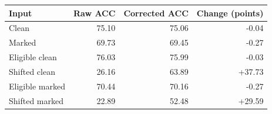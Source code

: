 \begin{tabular}{lrrr}\toprule
Input & Raw ACC & Corrected ACC & Change (points)\\\midrule
Clean & 75.10 & 75.06 & -0.04\\
Marked & 69.73 & 69.45 & -0.27\\
Eligible clean & 76.03 & 75.99 & -0.03\\
Shifted clean & 26.16 & 63.89 & +37.73\\
Eligible marked & 70.44 & 70.16 & -0.27\\
Shifted marked & 22.89 & 52.48 & +29.59\\
\bottomrule\end{tabular}
